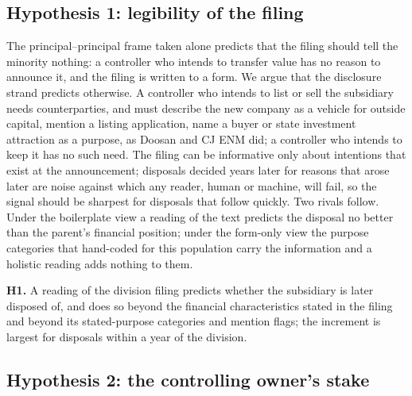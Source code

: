 \subsection{Hypothesis 1: legibility of the filing}\label{sec:h1}

The principal--principal frame taken alone predicts that the filing should tell the minority nothing: a controller who intends to transfer value has no reason to announce it, and the filing is written to a form. We argue that the disclosure strand predicts otherwise. A controller who intends to list or sell the subsidiary needs counterparties, and must describe the new company as a vehicle for outside capital, mention a listing application, name a buyer or state investment attraction as a purpose, as Doosan and CJ ENM did; a controller who intends to keep it has no such need. The filing can be informative only about intentions that exist at the announcement; disposals decided years later for reasons that arose later are noise against which any reader, human or machine, will fail, so the signal should be sharpest for disposals that follow quickly. Two rivals follow. Under the boilerplate view a reading of the text predicts the disposal no better than the parent's financial position; under the form-only view the purpose categories that  hand-coded for this population carry the information and a holistic reading adds nothing to them.

\textbf{H1.} A reading of the division filing predicts whether the subsidiary is later disposed of, and does so beyond the financial characteristics stated in the filing and beyond its stated-purpose categories and mention flags; the increment is largest for disposals within a year of the division.

\subsection{Hypothesis 2: the controlling owner's stake}\label{sec:h2}

